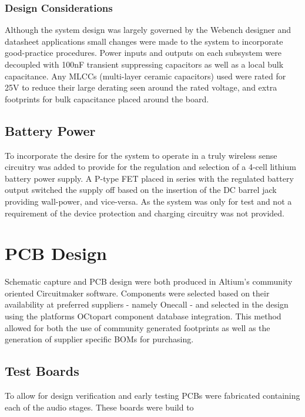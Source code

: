\documentclass[main.tex]{subfiles}
\begin{document}
\subsubsection{Design Considerations}

Although the system design was largely governed by the Webench designer and datasheet applications small changes were made to the system to incorporate good-practice procedures. Power inputs and outputs on each subsystem were decoupled with 100nF transient suppressing capacitors as well as a local bulk capacitance. Any MLCCs (multi-layer ceramic capacitors) used were rated for 25V to reduce their large derating seen around the rated voltage, and extra footprints for bulk capacitance placed around the board. 

\subsection{Battery Power}

To incorporate the desire for the system to operate in a truly wireless sense circuitry was added to provide for the regulation and selection of a 4-cell lithium battery power supply. A P-type FET placed in series with the regulated battery output switched the supply off based on the insertion of the DC barrel jack providing wall-power, and vice-versa. As the system was only for test and not a requirement of the device protection and charging circuitry was not provided. 

\section{PCB Design}

Schematic capture and PCB design were both produced in Altium's community oriented Circuitmaker software. Components were selected based on their availability at preferred suppliers - namely Onecall - and selected in the design using the platforms OCtopart component database integration. This method allowed for both the use of community generated footprints as well as the generation of supplier specific BOMs for purchasing. 

\subsection{Test Boards}
To allow for design verification and early testing PCBs were fabricated containing each of the audio stages. These boards were build to 
\end{document}

